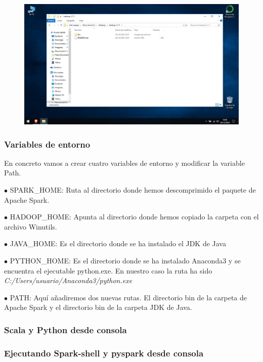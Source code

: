 \documentclass[a4paper,10pt]{article}
\begin{document}
\begin{figure}[H]
\begin{center}
\includegraphics[width=500pt]{./fotos/introduccion/17 - Hadoop.jpg}
\end{center}
\end{figure}

\subsubsection{Variables de entorno}

En concreto vamos a crear cuatro variables de entorno y modificar la variable Path.

$\bullet$ SPARK\_HOME: Ruta al directorio donde hemos descomprimido el paquete de Apache Spark. 

$\bullet$ HADOOP\_HOME: Apunta al directorio donde hemos copiado la carpeta con el archivo Winutils. 

$\bullet$ JAVA\_HOME: Es el directorio donde se ha instalado el JDK de Java

$\bullet$ PYTHON\_HOME: Es el directorio donde se ha instalado Anaconda3 y se encuentra el ejecutable python.exe. En nuestro caso la ruta ha sido \textit{C:/Users/usuario/Anaconda3/python.exe}

$\bullet$ PATH: Aquí añadiremos dos nuevas rutas. El directorio bin de la carpeta de Apache Spark y el directorio bin de la carpeta JDK de Java. 

\subsubsection{Scala y Python desde consola}

\subsubsection{Ejecutando Spark-shell y pyspark desde consola}
\end{document}
